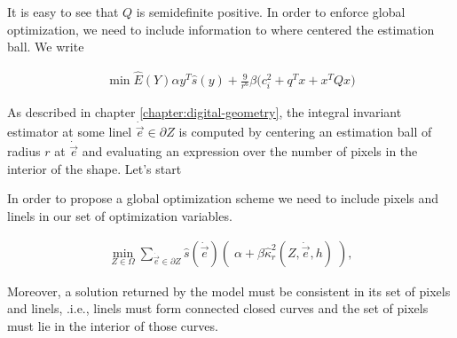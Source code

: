 	It is easy to see that $Q$ is semidefinite positive. In order to enforce global optimization, we need to include information to where centered the estimation ball. We write
	
	\begin{align*}
		\min \hat{E}(Y) \alpha y^T\hat{s}(y) + \frac{9}{r^6}\beta \big(c_i^2 + q^Tx + x^TQx\big)
	\end{align*}
	

 As described in chapter \ref{chapter:digital-geometry}, the integral invariant estimator at some linel $\dot{\vec{e}} \in \partial Z$ is computed by centering an estimation ball of radius $r$ at $\dot{\vec{e}}$ and evaluating an expression over the number of pixels in the interior of the shape. Let's start 



In order to propose a global optimization scheme we need to include pixels and linels in our set of optimization variables. 


	\begin{align*}
	\min_{Z \in \Omega} \sum_{\dot{\vec{e}} \in \partial Z}{ \hat{s}( \dot{\vec{e}})\left(\; \alpha + \beta \hat{\kappa}_{r}^2(Z,\dot{\vec{e}},h) \; \right)},
	\end{align*}


Moreover, a solution returned by the model must be consistent in its set of pixels and linels, .i.e., linels must form connected closed curves and the set of pixels must lie in the interior of those curves.

